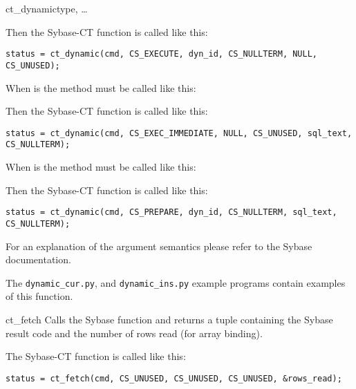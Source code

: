 \begin{methoddesc}[CS_COMMAND]{ct_dynamic}{type, \ldots}

Then the Sybase-CT  function is called like
this:

\begin{verbatim}
status = ct_dynamic(cmd, CS_EXECUTE, dyn_id, CS_NULLTERM, NULL, CS_UNUSED);
\end{verbatim}

When  is  the method must be called
like this:


Then the Sybase-CT  function is called like
this:

\begin{verbatim}
status = ct_dynamic(cmd, CS_EXEC_IMMEDIATE, NULL, CS_UNUSED, sql_text, CS_NULLTERM);
\end{verbatim}

When  is  the method must be called like
this:


Then the Sybase-CT  function is called like
this:

\begin{verbatim}
status = ct_dynamic(cmd, CS_PREPARE, dyn_id, CS_NULLTERM, sql_text, CS_NULLTERM);
\end{verbatim}

For an explanation of the argument semantics please refer to the
Sybase documentation.

The \texttt{dynamic_cur.py}, and \texttt{dynamic_ins.py} example
programs contain examples of this function.
\end{methoddesc}

\begin{methoddesc}[CS_COMMAND]{ct_fetch}{}
Calls the Sybase  function and returns a tuple
containing the Sybase result code and the number of rows read (for
array binding).

The Sybase-CT  function is called like this:

\begin{verbatim}
status = ct_fetch(cmd, CS_UNUSED, CS_UNUSED, CS_UNUSED, &rows_read);
\end{verbatim}
\end{methoddesc}

